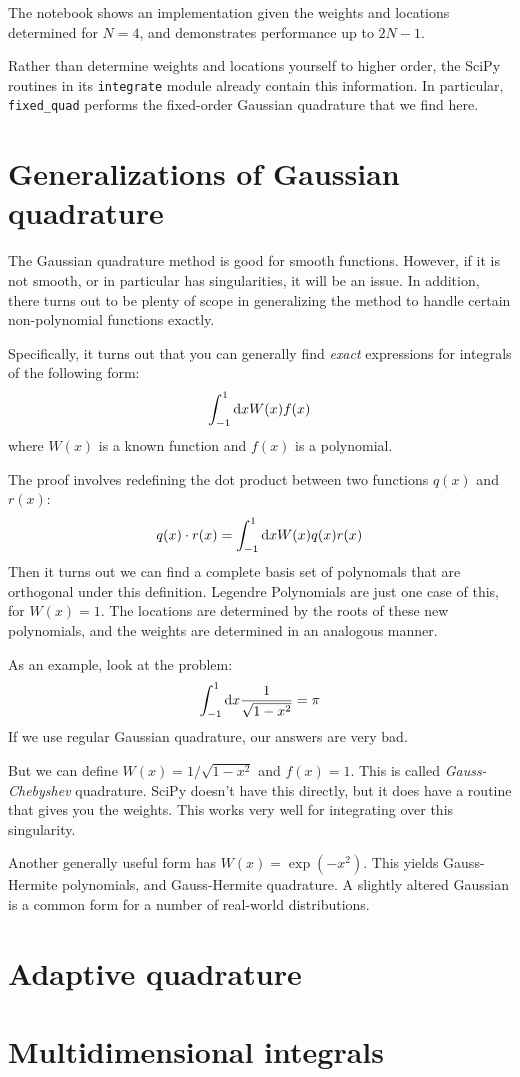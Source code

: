 The notebook shows an implementation given the weights and locations
determined for $N=4$, and demonstrates performance up to $2N-1$.

Rather than determine weights and locations yourself to higher order,
the SciPy routines in its {\tt integrate} module already contain this
information. In particular, {\tt fixed\_quad} performs the fixed-order
Gaussian quadrature that we find here.

\section{Generalizations of Gaussian quadrature}

The Gaussian quadrature method is good for smooth functions. However,
if it is not smooth, or in particular has singularities, it will be an
issue. In addition, there turns out to be plenty of scope in
generalizing the method to handle certain non-polynomial functions
exactly.

Specifically, it turns out that you can generally find {\it exact}
expressions for integrals of the following form:
\begin{equation}
\int_{-1}^{1} {\rm d}x W(x) f(x) 
\end{equation}
where $W(x)$ is a known function and $f(x)$ is a polynomial. 

The proof involves redefining the dot product between two functions
$q(x)$ and $r(x)$:
\begin{equation}
  q(x) \cdot r(x) = \int_{-1}^{1} {\rm d}x W(x) q(x) r(x)
\end{equation}
Then it turns out we can find a complete basis set of polynomals that
are orthogonal under this definition. Legendre Polynomials are just
one case of this, for $W(x)=1$. The locations are determined by the
roots of these new polynomials, and the weights are determined in an
analogous manner.

As an example, look at the problem:
\begin{equation}
\int_{-1}^{1} {\rm d}x \frac{1}{\sqrt{1-x^2}} = \pi
\end{equation}
If we use regular Gaussian quadrature, our answers are very bad.

But we can define $W(x)=1/\sqrt{1-x^2}$ and $f(x)=1$. This is called
{\it Gauss-Chebyshev} quadrature. SciPy doesn't have this directly,
but it does have a routine that gives you the weights.  This works
very well for integrating over this singularity.

Another generally useful form has $W(x) = \exp(-x^2)$. This yields
Gauss-Hermite polynomials, and Gauss-Hermite quadrature. A slightly
altered Gaussian is a common form for a number of real-world
distributions. 

\section{Adaptive quadrature}

\section{Multidimensional integrals}
